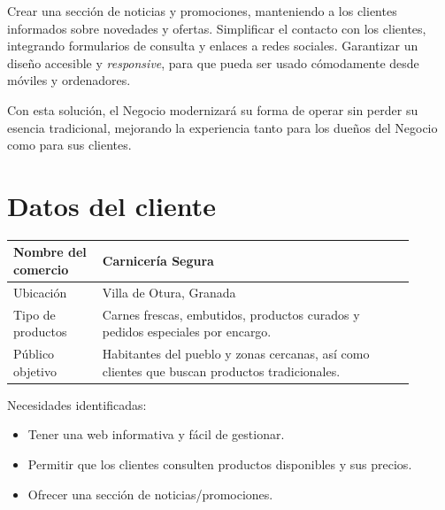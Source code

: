 \documentclass[a4paper]{article}
\newcommand{\textgap}{\vspace{1em}}
\begin{document}
Crear una sección de noticias y promociones, manteniendo a los clientes informados sobre novedades y ofertas.
Simplificar el contacto con los clientes, integrando formularios de consulta y enlaces a redes sociales.
Garantizar un diseño accesible y \textit{responsive}, para que pueda ser usado cómodamente desde móviles y ordenadores.

\textgap

Con esta solución, el Negocio modernizará su forma de operar sin perder su esencia tradicional, mejorando la experiencia tanto para los dueños del Negocio como para sus clientes.



\section{Datos del cliente}

\begin{table}[ht]
    \centering
    \begin{tabular}{| >{\raggedright\arraybackslash} p{0.2\linewidth} | p{0.7\linewidth} |}
        \hline
        \cellcolor{Snow2} Nombre del comercio & Carnicería Segura \\
        \hline
        \cellcolor{Snow2} Ubicación & Villa de Otura, Granada \\
        \hline
        \cellcolor{Snow2} Tipo de productos & Carnes frescas, embutidos, productos curados y pedidos especiales por encargo. \\
        \hline
        \cellcolor{Snow2} Público objetivo & Habitantes del pueblo y zonas cercanas, así como clientes que buscan productos tradicionales. \\
        \hline
    \end{tabular}
\end{table}


Necesidades identificadas:
\begin{itemize}

    \item Tener una web informativa y fácil de gestionar.

    \item Permitir que los clientes consulten productos disponibles y sus precios.

    \item Ofrecer una sección de noticias/promociones.

\end{itemize}
\end{document}
